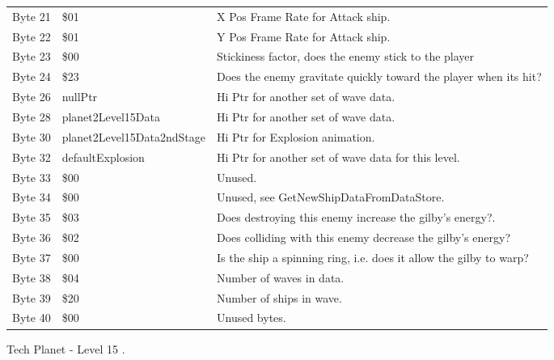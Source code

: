 \begin{figure}[H]
{\begin{adjustbox}{width=12cm}
\begin{tabular}{lll}
 Byte 21 & \$01                        & X Pos Frame Rate for Attack ship.                                  \\
 Byte 22 & \$01                        & Y Pos Frame Rate for Attack ship.                                  \\
 Byte 23 & \$00                        & Stickiness factor, does the enemy stick to the player              \\
 Byte 24 & \$23                        & Does the enemy gravitate quickly toward the player when its hit?   \\
 Byte 26 & nullPtr                    & Hi Ptr for another set of wave data.                               \\
 Byte 28 & planet2Level15Data         & Hi Ptr for another set of wave data.                               \\
 Byte 30 & planet2Level15Data2ndStage & Hi Ptr for Explosion animation.                                    \\
 Byte 32 & defaultExplosion           & Hi Ptr for another set of wave data for this level.                \\
 Byte 33 & \$00                        & Unused.                                                            \\
 Byte 34 & \$00                        & Unused, see GetNewShipDataFromDataStore.                           \\
 Byte 35 & \$03                        & Does destroying this enemy increase the gilby's energy?.           \\
 Byte 36 & \$02                        & Does colliding with this enemy decrease the gilby's energy?        \\
 Byte 37 & \$00                        & Is the ship a spinning ring, i.e. does it allow the gilby to warp? \\
 Byte 38 & \$04                        & Number of waves in data.                                           \\
 Byte 39 & \$20                        & Number of ships in wave.                                           \\
 Byte 40 & \$00                        & Unused bytes.                                                      \\
\bottomrule
\end{tabular}

  \end{adjustbox}

  }\caption*{Tech Planet - Level 15
.}
\end{figure}

